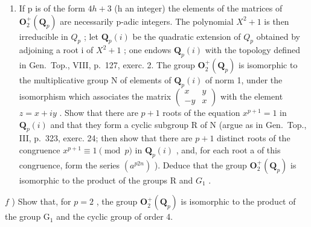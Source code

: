 \begin{enumerate}
\def\labelenumi{\alph{enumi})}
\setcounter{enumi}{4}
\tightlist
\item
  If p is of the form \(4h + 3\) (h an integer) the elements of the matrices of \(\mathbf{O}_{2}^{+}(\mathbf{Q}_{p})\) are necessarily p-adic integers. The polynomial \(X^{2} + 1\) is then irreducible in \(Q_{p}\) ; let \(\mathbf{Q}_{p}(i)\) be the quadratic extension of \(Q_{p}\) obtained by adjoining a root i of \(X^{2} + 1\) ; one endows \(\mathbf{Q}_{p}(i)\) with the topology defined in Gen.~Top., VIII, p.~127, exerc. 2. The group \(\mathbf{O}_{2}^{+}(\mathbf{Q}_{p})\) is isomorphic to the multiplicative group N of elements of \(\mathbf{Q}_{p}(i)\) of norm 1, under the isomorphism which associates the matrix \(\begin{pmatrix} x & y \\ -y & x \end{pmatrix}\) with the element \(z = x + iy\) . Show that there are \(p + 1\) roots of the equation \(x^{p+1} = 1\) in \(\mathbf{Q}_{p}(i)\) and that they form a cyclic subgroup R of N (argue as in Gen.~Top., III, p.~323, exerc. 24; then show that there are \(p + 1\) distinct roots of the congruence \(x^{p+1} \equiv 1 \pmod{p}\) in \(\mathbf{Q}_{p}(i)\) , and, for each root a of this congruence, form the series \((a^{p2n})\) ). Deduce that the group \(\mathbf{O}_{2}^{+}(\mathbf{Q}_{p})\) is isomorphic to the product of the groups R and \(G_{1}\) .
\end{enumerate}

\(f\) ) Show that, for \(p = 2\) , the group \(\mathbf{O}_2^+ (\mathbf{Q}_p)\) is isomorphic to the product of the group \(\mathrm{G}_1\) and the cyclic group of order 4.
